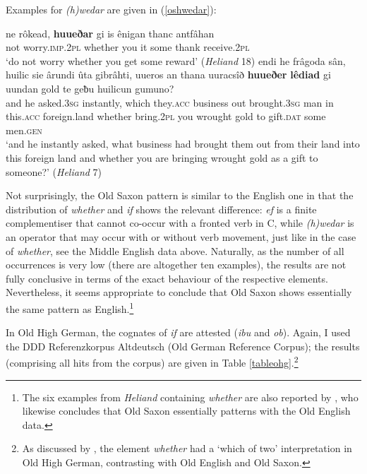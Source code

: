 Examples for \textit{(h)wedar} are given in (\ref{oshwedar}):

\ea \label{oshwedar}
\ea \gll ne rôkead, \textbf{huueðar} gi is ênigan thanc antfâhan\\
not worry.\textsc{imp.2pl} whether you it some thank receive.\textsc{2pl}\\
\glt `do not worry whether you get some reward' (\textit{Heliand} 18)
\ex \gll endi he frâgoda sân, huilic sie ârundi ûta gibrâhti, uueros an thana uuracsîð \textbf{huueðer} \textbf{lêdiad} gi uundan gold te geƀu huilicun gumuno?\\
and he asked.\textsc{3sg} instantly, which they.\textsc{acc} business out brought.\textsc{3sg} man in this.\textsc{acc} foreign.land whether bring.\textsc{2pl} you wrought gold to gift.\textsc{dat} some men.\textsc{gen}\\
\glt `and he instantly asked, what business had brought them out from their land into this foreign land and whether you are bringing wrought gold as a gift to someone?' (\textit{Heliand} 7)
\z
\z

Not surprisingly, the Old Saxon pattern is similar to the English one in that the distribution of \textit{whether} and \textit{if} shows the relevant difference: \textit{ef} is a finite complementiser that cannot co-occur with a fronted verb in C, while \textit{(h)wedar} is an operator that may occur with or without verb movement, just like in the case of \textit{whether}, see the Middle English data above. Naturally, as the number of all occurrences is very low (there are altogether ten examples), the results are not fully conclusive in terms of the exact behaviour of the respective elements. Nevertheless, it seems appropriate to conclude that Old Saxon shows essentially the same pattern as English.\footnote{The six examples from \textit{Heliand} containing \textit{whether} are also reported by \citet[150--151]{walkden2014}, who likewise concludes that Old Saxon essentially patterns with the Old English data.}

In Old High German, the cognates of \textit{if} are attested (\textit{ibu} and \textit{ob}). Again, I used the DDD Referenzkorpus Altdeutsch (Old German Reference Corpus); the results (comprising all hits from the corpus) are given in Table \ref{tableohg}.\footnote{As discussed by \citet[151--152, 155]{walkden2014}, the element \textit{whether} had a `which of two' interpretation in Old High German, contrasting with Old English and Old Saxon.}

